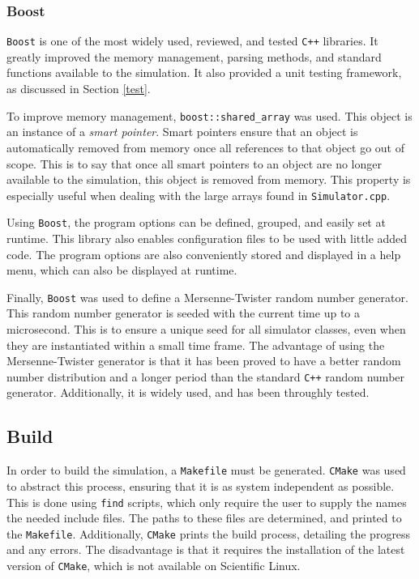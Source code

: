 \documentclass[a4paper,11pt]{article}
\begin{document}

\subsubsection{Boost}\label{boost}

\texttt{Boost} is one of the most widely used, reviewed, and tested \texttt{C++} libraries.  It greatly improved the memory management, parsing methods, and standard functions  available to the simulation.   It also provided a unit testing framework, as discussed in Section \ref{test}.  

To improve memory management, \texttt{boost::shared\_array} was used.  This object is an instance of a \emph{smart pointer}.  Smart pointers ensure that an object is automatically removed from memory once all references to that object go out of scope.  This is to say that once all smart pointers to an object are no longer available to the simulation, this object is removed from memory.  This property is especially useful when dealing with the large arrays found in \texttt{Simulator.cpp}.  

Using \texttt{Boost}, the program options can be defined, grouped, and easily set at runtime.  This library also enables configuration files to be used with little added code.  The program options are also conveniently stored and displayed in a help menu, which can also be displayed at runtime.  

Finally, \texttt{Boost} was used to define a Mersenne-Twister random number generator.  This random number generator is seeded with the current time up to a microsecond.  This is to ensure a unique seed for all simulator classes, even when they are instantiated within a small time frame.  The advantage of using the Mersenne-Twister generator is that it has been proved to have a better random number distribution and a longer period than the standard \texttt{C++} random number generator.  Additionally, it is widely used, and has been throughly tested.

\subsection{Build}

In order to build the simulation, a \texttt{Makefile} must be generated.  \texttt{CMake} was used to abstract this process, ensuring that it is as system independent as possible.   This is done using \texttt{find} scripts, which only require the user to supply the names the needed include files.  The paths to these files are determined, and printed to the \texttt{Makefile}.  Additionally, \texttt{CMake} prints the build process, detailing the progress and any errors.  The disadvantage is that it requires the installation of the latest version of \texttt{CMake}, which is not available on Scientific Linux.
\end{document}
